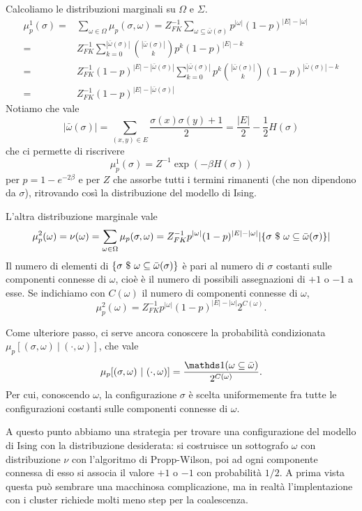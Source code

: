\documentclass[]{marticle}
\begin{document}
Calcoliamo le distribuzioni marginali su $\Omega$ e $\Sigma$.
\begin{align*}
    \mu^1_p(\sigma) =& \sum_{\omega\in\Omega} \mu_p(\sigma,\omega) = 
    Z_{FK}^{-1} \sum_{\omega\subseteq\bar{\omega}(\sigma)}  p^{|\omega|}
    (1-p)^{|E| - |\omega|} \\
    =& Z_{FK}^{-1} \sum_{k=0}^{|\bar{\omega}(\sigma)|}
        \binom{|\bar{\omega}(\sigma)|}{k}
        p^k (1-p)^{|E| - k} \\
    =& Z_{FK}^{-1} (1-p)^{|E|-|\bar{\omega}(\sigma)|}
        \sum_{k=0}^{|\bar{\omega}(\sigma)|}  p^k
        \binom{|\bar{\omega}(\sigma)|}{k}
        (1-p)^{|\bar{\omega}(\sigma)| - k} \\
    =& Z_{FK}^{-1} (1-p)^{|E|-|\bar{\omega}(\sigma)|}
\end{align*}
Notiamo che vale
\[
    |\bar{\omega}(\sigma)| = \sum_{(x,y)\in E} \frac{\sigma(x) \sigma(y) +
    1}{2} = \frac{|E|}{2} - \frac{1}{2}H(\sigma)
\]
che ci permette di riscrivere
\[
    \mu^1_p(\sigma) = Z^{-1} \exp(-\beta H(\sigma))
\]
per $p = 1-e^{-2\beta}$ e per $Z$ che assorbe tutti i termini rimanenti (che non
dipendono da $\sigma$), ritrovando cos\`i la distribuzione del modello di Ising.

L'altra distribuzione marginale vale
\[
    \mu^2_p(\omega) = \nu(\omega) = \sum_{\omega\in\Omega} \mu_p(\sigma,\omega)
    = Z_{FK}^{-1} p^{|\omega|} (1-p)^{|E| - |\omega|} |\{\sigma \ \$\ 
    \omega\subseteq\bar{\omega}(\sigma)\}|
\]
Il numero di elementi di $\{\sigma \ \$\ 
\omega\subseteq\bar{\omega}(\sigma)\}$ \`e pari al numero di $\sigma$ costanti
sulle componenti connesse di $\omega$, cio\`e \`e il numero di possibili
assegnazioni di $+1$ o $-1$ a esse. Se indichiamo con $C(\omega)$ il numero di
componenti connesse di $\omega$,
\[
    \mu^2_p(\omega) = 
    Z_{FK}^{-1} p^{|\omega|} (1-p)^{|E| - |\omega|} 2^{C(\omega)}.
\]

Come ulteriore passo, ci serve ancora conoscere la probabilit\`a condizionata
$\mu_p[(\sigma,\omega)\ |\ (\cdot,\omega)]$, che vale 
\[
    \mu_p[(\sigma,\omega)\ |\ (\cdot,\omega)]
    = \frac{\ind(\omega \subseteq \bar{\omega})} {2^{C(\omega)}}.
\]
Per cui, conoscendo $\omega$, la configurazione $\sigma$ \`e scelta
uniformemente fra tutte le configurazioni costanti sulle componenti connesse di
$\omega$.

A questo punto abbiamo una strategia per trovare una configurazione del modello
di Ising con la distribuzione desiderata: si costruisce un sottografo $\omega$
con distribuzione $\nu$ con l'algoritmo di Propp-Wilson, poi ad ogni componente
connessa di esso si associa il valore $+1$ o $-1$ con probabilit\`a $1/2$. A
prima vista questa pu\`o sembrare una macchinosa complicazione, ma in realt\`a
l'implentazione con i cluster richiede molti meno step per la coalescenza.
\end{document}
